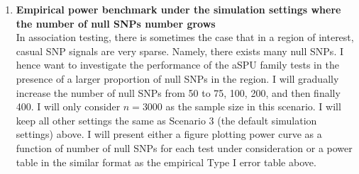 \documentclass[12pt]{article}
\begin{document}
\begin{enumerate}
%

\item \textbf{Empirical power benchmark under the simulation settings where the number of null SNPs number grows}\\
In association testing, there is sometimes the case that in a region of interest, casual SNP signals are very sparse. Namely, there exists many null SNPs. I hence want to investigate the performance of the aSPU family tests in the presence of a larger proportion of null SNPs in the region. I will gradually increase the number of null SNPs from 50 to 75, 100, 200, and then finally 400. I will only consider $n = 3000$ as the sample size in this scenario. I will keep all other settings the same as Scenario 3 (the default simulation settings) above. I will present either a figure plotting power curve as a function of number of null SNPs for each test under consideration or a power table in the similar format as the empirical Type I error table above.


\end{enumerate}
\end{document}
